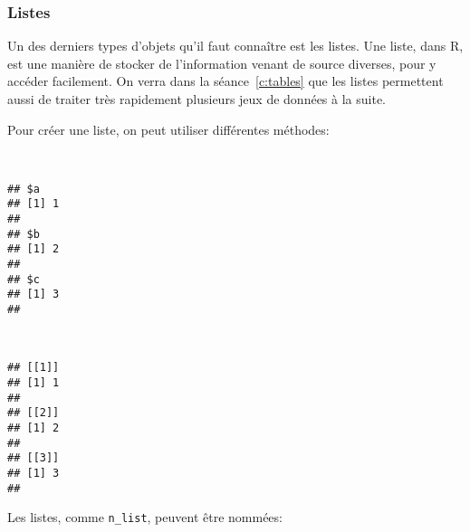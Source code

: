 \subsubsection{Listes}

Un des derniers types d'objets qu'il faut connaître est les listes.
Une liste, dans R, est une manière de stocker de l'information venant de source diverses, pour y accéder facilement.
On verra dans la séance~\ref{c:tables} que les listes permettent aussi de traiter très rapidement plusieurs jeux de données à la suite.

Pour créer une liste, on peut utiliser différentes méthodes:

\begin{knitrout}
\color{fgcolor}\begin{kframe}
\begin{flushleft}
\ttfamily\noindent
{}\hlassignement{\usebox{\hlnormalsizeboxlessthan}-}{\ }\hlkeyword{(}\hlargument{=}{\ }\hlkeyword{,}{\ }\hlargument{=}{\ }\hlkeyword{,}{\ }\hlargument{=}{\ }\hlkeyword{)}\hspace*{\fill}\\
\hlstd{}\mbox{}
\normalfont
\end{flushleft}
\begin{verbatim}
## $a
## [1] 1
## 
## $b
## [1] 2
## 
## $c
## [1] 3
## 
\end{verbatim}
\begin{flushleft}
\ttfamily\noindent
{}\hlassignement{\usebox{\hlnormalsizeboxlessthan}-}{\ }\hlkeyword{(}\hlkeyword{,}{\ }\hlkeyword{,}{\ }\hlkeyword{)}\hspace*{\fill}\\
\hlstd{}\mbox{}
\normalfont
\end{flushleft}
\begin{verbatim}
## [[1]]
## [1] 1
## 
## [[2]]
## [1] 2
## 
## [[3]]
## [1] 3
## 
\end{verbatim}
\end{kframe}
\end{knitrout}


Les listes, comme \texttt{n\_list}, peuvent être nommées:

